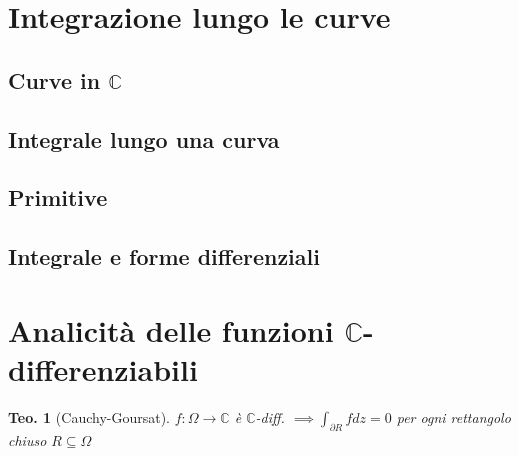 \documentclass[a4paper,10pt]{article}
\newcommand{\im}{\mathbb{C}} %
\theoremstyle{indentdefinition}
\theoremstyle{indenttheorem}
\newtheorem{thm}{Teo.}
\theoremstyle{myremark}
\theoremstyle{indentgeneral}
\begin{document}
\section{Integrazione lungo le curve}

\subsection{Curve in $\mathbb{C}$}
\subsection{Integrale lungo  una curva}
\subsection{Primitive}
\subsection{Integrale e forme differenziali}

\section{Analicità delle funzioni $\mathbb{C}$-differenziabili}

\begin{thm}[Cauchy-Goursat] $f:\Omega\to\im$ è $\im$-diff. $\implies \int_{\partial R}fdz=0$ per ogni rettangolo chiuso $R\subseteq \Omega$
\end{thm}
\end{document}
